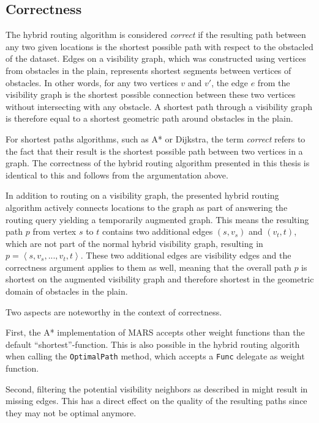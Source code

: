 	\subsection{Correctness}
	\label{subsec:correctness}
	
		The hybrid routing algorithm is considered \emph{correct} if the resulting path between any two given locations is the shortest possible path with respect to the obstacled of the dataset.
		Edges on a visibility graph, which was constructed using vertices from obstacles in the plain, represents shortest segments between vertices of obstacles.
		In other words, for any two vertices $v$ and $v'$, the edge $e$ from the visibility graph is the shortest possible connection between these two vertices without intersecting with any obstacle.
		A shortest path through a visibility graph is therefore equal to a shortest geometric path around obstacles in the plain.
		
		For shortest paths algorithms, such as A* or Dijkstra, the term \emph{correct} refers to the fact that their result is the shortest possible path between two vertices in a graph.
		The correctness of the hybrid routing algorithm presented in this thesis is identical to this and follows from the argumentation above.
		
		In addition to routing on a visibility graph, the presented hybrid routing algorithm actively connects locations to the graph as part of answering the routing query yielding a temporarily augmented graph.
		This means the resulting path $p$ from vertex $s$ to $t$ contains two additional edges $(s, v_s)$ and $(v_t, t)$, which are not part of the normal hybrid visibility graph, resulting in $p=\left\langle s, v_s, ..., v_t, t \right\rangle$.
		These two additional edges are visibility edges and the correctness argument applies to them as well, meaning that the overall path $p$ is shortest on the augmented visibility graph and therefore shortest in the geometric domain of obstacles in the plain.
		
		Two aspects are noteworthy in the context of correctness.
		
		First, the A* implementation of MARS accepts other weight functions than the default \enquote{shortest}-function.
		This is also possible in the hybrid routing algorith when calling the \texttt{OptimalPath} method, which accepts a \texttt{Func} delegate as weight function.
		
		Second, filtering the potential visibility neighbors as described in  might result in missing edges.
		This has a direct effect on the quality of the resulting paths since they may not be optimal anymore.
		
